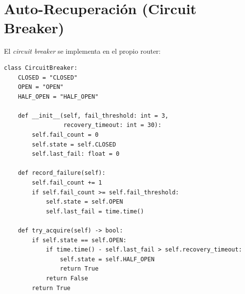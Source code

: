 \section{Auto-Recuperación (Circuit Breaker)}

El \textit{circuit breaker} se implementa en el propio router:

\begin{verbatim}
class CircuitBreaker:
    CLOSED = "CLOSED"
    OPEN = "OPEN"
    HALF_OPEN = "HALF_OPEN"
    
    def __init__(self, fail_threshold: int = 3, 
                 recovery_timeout: int = 30):
        self.fail_count = 0
        self.state = self.CLOSED
        self.last_fail: float = 0
    
    def record_failure(self):
        self.fail_count += 1
        if self.fail_count >= self.fail_threshold:
            self.state = self.OPEN
            self.last_fail = time.time()
    
    def try_acquire(self) -> bool:
        if self.state == self.OPEN:
            if time.time() - self.last_fail > self.recovery_timeout:
                self.state = self.HALF_OPEN
                return True
            return False
        return True
\end{verbatim}

%
%
%
%
%
